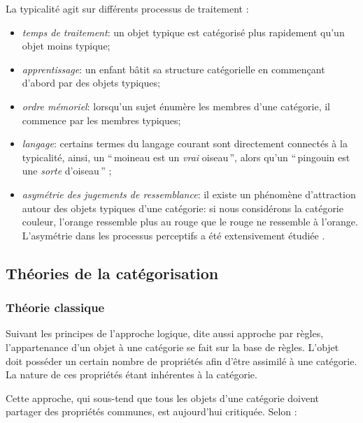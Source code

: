 La typicalité agit sur différents processus de traitement \citep[p. 51]{Houix03f,mervis1981categorization}:

\begin{itemize}
\item \emph{temps de traitement}: un objet typique est catégorisé plus rapidement qu'un objet moins typique;
\item \emph{apprentissage}: un enfant bâtit sa structure catégorielle en commençant d'abord par des objets typiques;
\item \emph{ordre mémoriel}: lorsqu'un sujet énumère les membres d'une catégorie, il commence par les membres typiques;
\item \emph{langage}: certains termes du langage courant sont directement connectés à la typicalité, ainsi, un ``\,moineau est un \emph{vrai} oiseau\,'', alors qu'un ``\,pingouin est une \emph{sorte} d'oiseau\,'' \citep{mervis1981categorization};
\item \emph{asymétrie des jugements de ressemblance}: il existe un phénomène d'attraction autour des objets typiques d'une catégorie: si nous considérons la catégorie couleur, l’orange ressemble plus au rouge que le rouge ne ressemble à l'orange. L'asymétrie dans les processus perceptifs a été extensivement étudiée \citep{tversky1977features,krumhansl1978concerning}.
\end{itemize}


\subsection{Théories de la catégorisation}

\subsubsection{Théorie classique}

Suivant les principes de l'approche logique, dite aussi approche par règles, l'appartenance d'un objet à une catégorie se fait sur la base de règles. L'objet doit posséder un certain nombre de propriétés afin d'être assimilé à une catégorie. La nature de ces propriétés étant inhérentes à la catégorie.

Cette approche, qui sous-tend que tous les objets d'une catégorie doivent partager des propriétés communes, est aujourd'hui critiquée. Selon \citep{goldstone2003concepts}:

